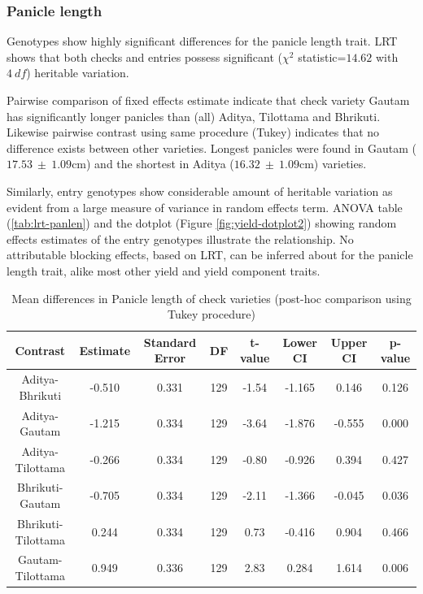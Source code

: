 \documentclass[12pt,oneside]{dukestatscithesis} %
\theoremstyle{definition}
\theoremstyle{definition}
\theoremstyle{definition}
\theoremstyle{remark}
\begin{document}
\subsubsection{Panicle length}\label{panicle-length}

Genotypes show highly significant differences for the panicle length
trait. LRT shows that both checks and entries possess significant
(\(\chi^2\) statistic=\(14.62\) with \(4\ df\)) heritable variation.

Pairwise comparison of fixed effects estimate indicate that check
variety Gautam has significantly longer panicles than (all) Aditya,
Tilottama and Bhrikuti. Likewise pairwise contrast using same procedure
(Tukey) indicates that no difference exists between other varieties.
Longest panicles were found in Gautam (\(17.53\ \pm\ 1.09\)cm) and the
shortest in Aditya (\(16.32\ \pm\ 1.09\)cm) varieties.

Similarly, entry genotypes show considerable amount of heritable
variation as evident from a large measure of variance in random effects
term. ANOVA table (\ref{tab:lrt-panlen}) and the dotplot (Figure
\ref{fig:yield-dotplot2}) showing random effects estimates of the entry
genotypes illustrate the relationship. No attributable blocking effects,
based on LRT, can be inferred about for the panicle length trait, alike
most other yield and yield component traits.
\begin{table}[H]

\caption{\label{tab:yield-meanconf-tab5}Mean differences in Panicle length of check varieties (post-hoc comparison using Tukey procedure)}
\centering
\begin{tabular}[t]{cccccccc}
\toprule
Contrast & Estimate & Standard Error & DF & t-value & Lower CI & Upper CI & p-value\\
\midrule
Aditya-Bhrikuti & -0.510 & 0.331 & 129 & -1.54 & -1.165 & 0.146 & 0.126\\
Aditya-Gautam & -1.215 & 0.334 & 129 & -3.64 & -1.876 & -0.555 & 0.000\\
Aditya-Tilottama & -0.266 & 0.334 & 129 & -0.80 & -0.926 & 0.394 & 0.427\\
Bhrikuti-Gautam & -0.705 & 0.334 & 129 & -2.11 & -1.366 & -0.045 & 0.036\\
Bhrikuti-Tilottama & 0.244 & 0.334 & 129 & 0.73 & -0.416 & 0.904 & 0.466\\
Gautam-Tilottama & 0.949 & 0.336 & 129 & 2.83 & 0.284 & 1.614 & 0.006\\
\bottomrule
\end{tabular}
\end{table}
\end{document}
